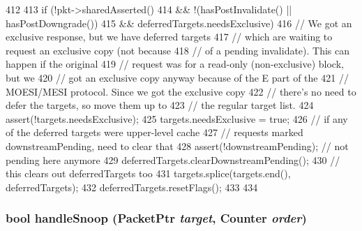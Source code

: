 \begin{DoxyCode}
412 {
413     if (!pkt->sharedAsserted()
414         && !(hasPostInvalidate() || hasPostDowngrade())
415         && deferredTargets.needsExclusive) {
416         // We got an exclusive response, but we have deferred targets
417         // which are waiting to request an exclusive copy (not because
418         // of a pending invalidate).  This can happen if the original
419         // request was for a read-only (non-exclusive) block, but we
420         // got an exclusive copy anyway because of the E part of the
421         // MOESI/MESI protocol.  Since we got the exclusive copy
422         // there's no need to defer the targets, so move them up to
423         // the regular target list.
424         assert(!targets.needsExclusive);
425         targets.needsExclusive = true;
426         // if any of the deferred targets were upper-level cache
427         // requests marked downstreamPending, need to clear that
428         assert(!downstreamPending);  // not pending here anymore
429         deferredTargets.clearDownstreamPending();
430         // this clears out deferredTargets too
431         targets.splice(targets.end(), deferredTargets);
432         deferredTargets.resetFlags();
433     }
434 }
\end{DoxyCode}
\hypertarget{classMSHR_a7501595166901f8ddffcad271441cdf4}{
\subsubsection[{handleSnoop}]{\setlength{\rightskip}{0pt plus 5cm}bool handleSnoop ({\bf PacketPtr} {\em target}, \/  {\bf Counter} {\em order})}}
\label{classMSHR_a7501595166901f8ddffcad271441cdf4}



